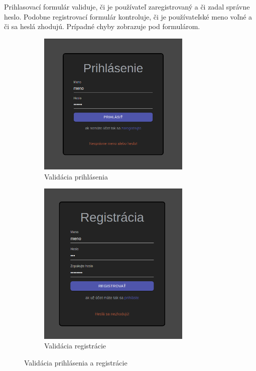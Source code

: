 Prihlasovací formulár validuje, či je používateľ zaregistrovaný a či zadal správne heslo. Podobne
registrovací formulár kontroluje, či je používateľské meno voľné a či sa heslá zhodujú. Prípadné
chyby zobrazuje pod formulárom.
\begin{figure}[H]
\centering
\begin{subfigure}{.5\textwidth}
  \centering
  \includegraphics[width=0.8\textwidth]{images/validacia_prihlasenie}
  \caption[Validácia prihlásenia]{Validácia prihlásenia}
  \label{obr:validacia_prihlasenie}
\end{subfigure}%
\begin{subfigure}{.5\textwidth}
  \centering
  \includegraphics[width=0.8\textwidth]{images/validacia_registracia}
  \caption[Validácia registrácie]{Validácia registrácie}
  \label{obr:validacia_registracia}
\end{subfigure}
\caption{Validácia prihlásenia a registrácie}
\end{figure}

